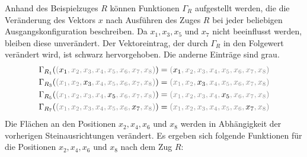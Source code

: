 \documentclass[12pt,a4paper, usenames, dvipsnames]{article}
\theoremstyle{mystyle}
\theoremstyle{definition}
\begin{document}
Anhand des Beispielzuges $R$ können Funktionen $\Gamma_R$ aufgestellt werden, die die Veränderung des Vektors $x$ nach Ausführen des Zuges $R$ bei jeder beliebigen Ausgangskonfiguration beschreiben. Da $x_1, x_3, x_5$ und $x_7$ nicht beeinflusst werden, bleiben diese unverändert. Der Vektoreintrag, der durch $\Gamma_R$ in den Folgewert verändert wird, ist schwarz hervorgehoben. Die anderne Einträge sind grau.
\begin{align*}
& \Gamma_{R_1}(\textcolor{gray}{(\textcolor{black}{x_1}, x_2, x_3, x_4, x_5, x_6, x_7, x_8  )})=\textcolor{gray}{(\textcolor{black}{x_1}, x_2, x_3, x_4, x_5, x_6, x_7, x_8  )} \\
& \Gamma_{R_3}(\textcolor{gray}{(x_1, x_2, \textcolor{black}{x_3}, x_4, x_5, x_6, x_7, x_8  )})=\textcolor{gray}{(x_1, x_2, \textcolor{black}{x_3}, x_4, x_5, x_6, x_7, x_8  )} \\
& \Gamma_{R_5}(\textcolor{gray}{(x_1, x_2, x_3, x_4, \textcolor{black}{x_5}, x_6, x_7, x_8  )})=\textcolor{gray}{(x_1, x_2, x_3, x_4, \textcolor{black}{x_5}, x_6, x_7, x_8  )}\\
& \Gamma_{R_7}(\textcolor{gray}{(x_1, x_2, x_3, x_4, x_5, x_6,\textcolor{black}{x_7}, x_8  )})=\textcolor{gray}{(x_1, x_2, x_3, x_4, x_5, x_6, \textcolor{black}{x_7}, x_8  )} 
\end{align*}
Die Flächen an den Positionen $x_2, x_4, x_6$ und $x_8$ werden in Abhängigkeit der vorherigen Steinausrichtungen verändert. Es ergeben sich folgende Funktionen für die Positionen $x_2, x_4, x_6$ und $x_8$ nach dem Zug $R$: 
\end{document}
